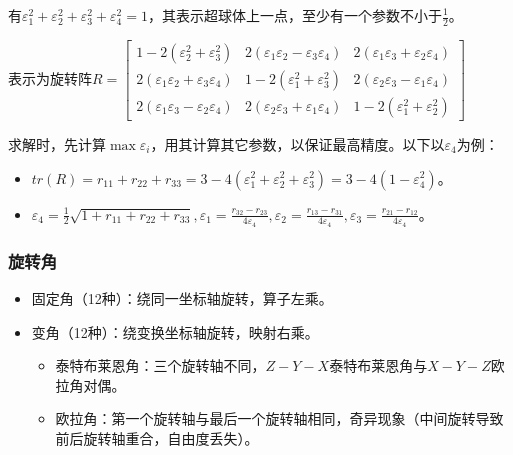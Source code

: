 \documentclass[
12pt, %
a4paper, 
oneside, %
headinclude,footinclude, %
]{scrartcl}
\begin{document}
有$ \varepsilon_1^2 + \varepsilon_2^2 + \varepsilon_3^2 + \varepsilon_4^2 = 1 $，其表示超球体上一点，至少有一个参数不小于$ \frac{1}{2} $。

表示为旋转阵$ R = \begin{bmatrix} 1 - 2(\varepsilon_2^2 + \varepsilon_3^2) & 2(\varepsilon_1 \varepsilon_2 - \varepsilon_3 \varepsilon_4) & 2(\varepsilon_1 \varepsilon_3 + \varepsilon_2 \varepsilon_4) \\ 2(\varepsilon_1 \varepsilon_2 + \varepsilon_3 \varepsilon_4) & 1 - 2(\varepsilon_1^2 + \varepsilon_3^2) & 2(\varepsilon_2 \varepsilon_3 - \varepsilon_1 \varepsilon_4) \\ 2(\varepsilon_1 \varepsilon_3 - \varepsilon_2 \varepsilon_4) & 2(\varepsilon_2 \varepsilon_3 + \varepsilon_1 \varepsilon_4) & 1 - 2(\varepsilon_1^2 + \varepsilon_2^2) \end{bmatrix} $

求解时，先计算$ \max{\varepsilon_i }$，用其计算其它参数，以保证最高精度。以下以$ \varepsilon_4 $为例：
\begin{itemize}
\item $ tr(R) = r_{11} + r_{22} + r_{33} = 3 - 4(\varepsilon_1^2 + \varepsilon_2^2 + \varepsilon_3^2) = 3 - 4(1 - \varepsilon_4^2) $。
\item $ \varepsilon_4 = \frac{1}{2} \sqrt{1 + r_{11} + r_{22} + r_{33}}, \varepsilon_1 = \frac{r_{32} - r_{23}}{4 \varepsilon_4}, \varepsilon_2 = \frac{r_{13} - r_{31}}{4 \varepsilon_4}, \varepsilon_3 = \frac{r_{21} - r_{12}}{4 \varepsilon_4} $。
\end{itemize}
\subsubsection[旋转角]{旋转角}
\begin{itemize}
\item 固定角（12种）：绕同一坐标轴旋转，算子左乘。
\item 变角（12种）：绕变换坐标轴旋转，映射右乘。
\begin{itemize}
\item 泰特布莱恩角：三个旋转轴不同，$ Z-Y-X $泰特布莱恩角与$ X-Y-Z $欧拉角对偶。
\item 欧拉角：第一个旋转轴与最后一个旋转轴相同，奇异现象（中间旋转导致前后旋转轴重合，自由度丢失）。
\end{itemize}
\end{itemize}
\end{document}
